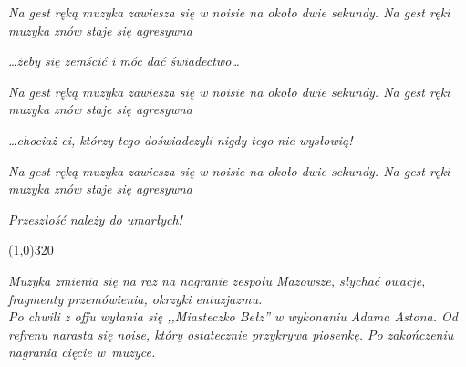 \documentclass[11pt,a4paper,oneside]{article}
\begin{document}
{\color{light-gray} \emph{Na gest ręką
muzyka zawiesza się w noisie na około dwie sekundy. Na gest ręki
muzyka znów staje się agresywna}}

\emph{\dots{}żeby się zemścić i móc dać świadectwo\dots{}}

{\color{light-gray} \emph{Na gest ręką
muzyka zawiesza się w noisie na około dwie sekundy. Na gest ręki
muzyka znów staje się agresywna}}

\emph{\dots{}chociaż ci, którzy tego doświadczyli nigdy tego nie wysłowią!}

{\color{light-gray} \emph{Na gest ręką
muzyka zawiesza się w noisie na około dwie sekundy. Na gest ręki
muzyka znów staje się agresywna}}

\emph{Przeszłość należy do umarłych!}

\line(1,0){320}

{\color{light-gray} \emph{Muzyka zmienia się na raz na nagranie
zespołu Mazowsze, słychać owacje, fragmenty przemówienia,
okrzyki entuzjazmu. \\ Po chwili z offu wyłania się ,,Miasteczko
Bełz'' w wykonaniu Adama Astona. Od refrenu narasta się noise,
który ostatecznie przykrywa piosenkę. Po zakończeniu nagrania
cięcie w~muzyce.}}
\end{document}
